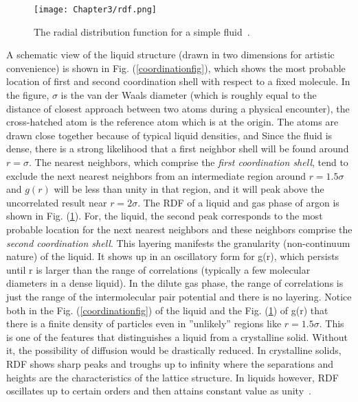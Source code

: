  \begin{figure}[h!]
 \centering
 \texttt{[image: Chapter3/rdf.png]}
  \caption[The radial distribution function for a simple fluid.]{The radial distribution function for a simple fluid~\citep{chandler1987}.} 
 \label{rdffig} 
 \end{figure}
 
  A schematic view of the liquid structure (drawn in two dimensions for artistic convenience) is shown in Fig. (\ref{coordinationfig}), which shows the most probable location of first and second coordination shell with respect to a fixed molecule. In the figure, $\sigma$ is the van der Waals diameter (which is roughly equal to  the distance of closest approach between two atoms during a physical  encounter), the cross-hatched atom is the reference atom which is at the origin. The atoms are drawn close  together because of typical liquid densities, and  Since the fluid is  dense, there is a strong likelihood that a first neighbor shell will be  found around $r = \sigma$. The nearest neighbors, which comprise the \textit{first  coordination shell}, tend to exclude the next nearest neighbors from an intermediate region around $r = 1.5 \sigma$ and  $g(r)$ will be less than 
  unity in that region, and it will peak above the uncorrelated result 
  near $r = 2\sigma$. The RDF of a liquid and gas phase of argon is shown in Fig. (\ref{rdffig}). For, the  liquid, the second peak corresponds to the most probable
  location for the next nearest neighbors and these neighbors comprise  the \textit{second coordination shell}. This layering manifests the granularity  (non-continuum nature) of the liquid. It shows up in an oscillatory  form for g(r), which persists until r is larger than the range of  correlations (typically a few molecular diameters in a dense liquid). In the dilute gas phase, the range of correlations is just the range of the intermolecular pair potential and there is no layering.   Notice both in the  Fig. (\ref{coordinationfig}) of the liquid  and the Fig. (\ref{rdffig}) of g(r)  that there is a finite density of particles even in ''unlikely'' regions  like $r = 1.5 \sigma $. This is one of the features that distinguishes a liquid from a crystalline solid. Without it, the possibility of diffusion would  be drastically reduced. In crystalline solids, RDF shows sharp peaks and troughs up to infinity where the separations and heights are  the characteristics of the lattice structure. In liquids however, RDF oscillates up to  certain orders and then attains constant value as unity~\citep{chandler1987, mcquarrie2000}.
  
